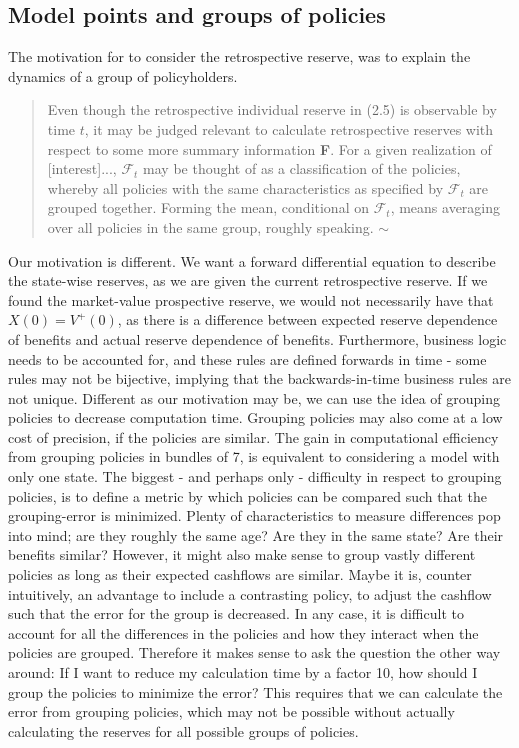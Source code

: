 \documentclass[12pt]{article}
\begin{document}
\subsection*{Model points and groups of policies}
The motivation for \citet{Norberg} to consider the retrospective reserve, was to explain the dynamics of a group of policyholders. 
\begin{quote}
Even though the retrospective individual reserve in (2.5) is observable by time $t$, it may be judged relevant to calculate retrospective reserves with respect to some more summary information \textbf{F}. For a given realization of [interest]..., $\mathcal{F}_t$ may be thought of as a classification of the policies, whereby all policies with the same characteristics as specified by $\mathcal{F}_t$ are grouped together. Forming the mean, conditional on $\mathcal{F}_t$, means averaging over all policies in the same group, roughly speaking. \newline $\sim$ \citet{Norberg}
\end{quote}
Our motivation is different. We want a forward differential equation to describe the state-wise reserves, as we are given the current retrospective reserve. If we found the market-value prospective reserve, we would not necessarily have that $X(0)=V^+(0)$, as there is a difference between expected reserve dependence of benefits and actual reserve dependence of benefits. Furthermore, business logic needs to be accounted for, and these rules are defined forwards in time - some rules may not be bijective, implying that the backwards-in-time business rules are not unique. Different as our motivation may be, we can use the idea of grouping policies to decrease computation time. Grouping policies may also come at a low cost of precision, if the policies are similar. The gain in computational efficiency from grouping policies in bundles of 7, is equivalent to considering a model with only one state. The biggest - and perhaps only - difficulty in respect to grouping policies, is to define a metric by which policies can be compared such that the grouping-error is minimized. Plenty of characteristics to measure differences pop into mind; are they roughly the same age? Are they in the same state? Are their benefits similar? However, it might also make sense to group vastly different policies as long as their expected cashflows are similar. Maybe it is, counter intuitively, an advantage to include a contrasting policy, to adjust the cashflow such that the error for the group is decreased. In any case, it is difficult to account for all the differences in the policies and how they interact when the policies are grouped. Therefore it makes sense to ask the question the other way around: If I want to reduce my calculation time by a factor 10, how should I group the policies to minimize the error? This requires that we can calculate the error from grouping policies, which may not be possible without actually calculating the reserves for all possible groups of policies.\\
\end{document}
